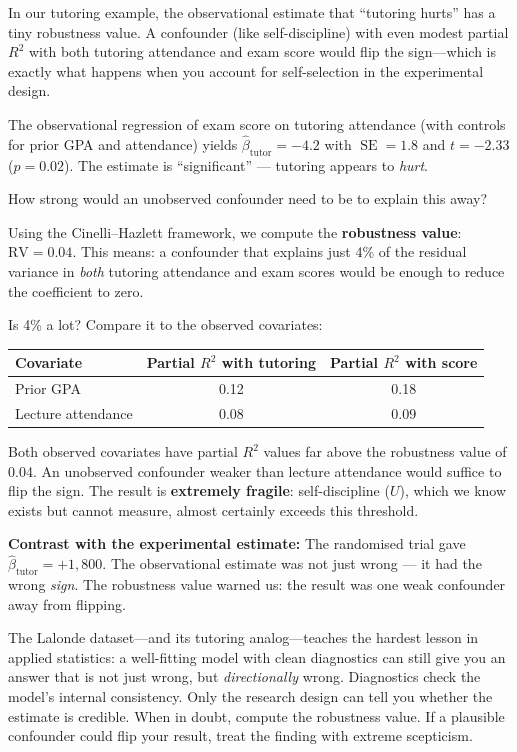 \documentclass[11pt,a4paper]{article}
\theoremstyle{definition}
\theoremstyle{plain}
\theoremstyle{remark}
\newcommand{\se}{\operatorname{SE}}
\newcommand{\bhat}{\hat{\beta}}
\begin{document}
In our tutoring example, the observational estimate that ``tutoring hurts'' has a tiny robustness value. A confounder (like self-discipline) with even modest partial $R^2$ with both tutoring attendance and exam score would flip the sign---which is exactly what happens when you account for self-selection in the experimental design.

\begin{numermark}[title={How Fragile Is the Tutoring Estimate?}]
The observational regression of exam score on tutoring attendance (with controls for prior GPA and attendance) yields $\bhat_{\text{tutor}} = -4.2$ with $\se = 1.8$ and $t = -2.33$ ($p = 0.02$). The estimate is ``significant'' --- tutoring appears to \emph{hurt}.

How strong would an unobserved confounder need to be to explain this away?

Using the Cinelli--Hazlett framework, we compute the \textbf{robustness value}: $\text{RV} = 0.04$. This means: a confounder that explains just 4\% of the residual variance in \emph{both} tutoring attendance and exam scores would be enough to reduce the coefficient to zero.

Is 4\% a lot? Compare it to the observed covariates:
\begin{center}
\begin{tabular}{@{}lcc@{}}
\toprule
\textbf{Covariate} & \textbf{Partial $R^2$ with tutoring} & \textbf{Partial $R^2$ with score} \\
\midrule
Prior GPA & 0.12 & 0.18 \\
Lecture attendance & 0.08 & 0.09 \\
\bottomrule
\end{tabular}
\end{center}

Both observed covariates have partial $R^2$ values far above the robustness value of 0.04. An unobserved confounder weaker than lecture attendance would suffice to flip the sign. The result is \textbf{extremely fragile}: self-discipline ($U$), which we know exists but cannot measure, almost certainly exceeds this threshold.

\textbf{Contrast with the experimental estimate:} The randomised trial gave $\bhat_{\text{tutor}} = +1{,}800$. The observational estimate was not just wrong --- it had the wrong \emph{sign}. The robustness value warned us: the result was one weak confounder away from flipping.
\end{numermark}

\begin{keyinsight}
The Lalonde dataset---and its tutoring analog---teaches the hardest lesson in applied statistics: a well-fitting model with clean diagnostics can still give you an answer that is not just wrong, but \emph{directionally} wrong. Diagnostics check the model's internal consistency. Only the research design can tell you whether the estimate is credible. When in doubt, compute the robustness value. If a plausible confounder could flip your result, treat the finding with extreme scepticism.
\end{keyinsight}
\end{document}
